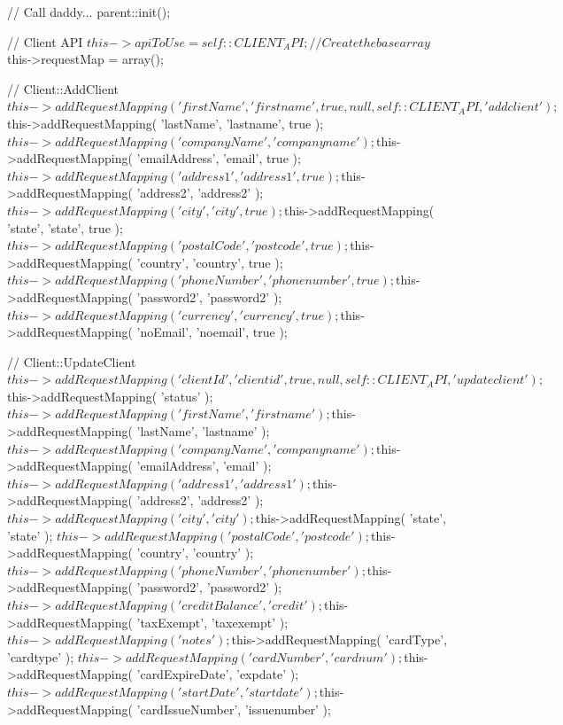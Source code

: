 \begin{DoxyCode}
    {
        //  Call daddy...
        parent::init();

        //  Client API
        $this->apiToUse = self::CLIENT_API;
        
        //  Create the base array
        $this->requestMap = array();

        //  Client::AddClient
        $this->addRequestMapping( 'firstName', 'firstname', true, null, self::CLI
      ENT_API, 'addclient' );
        $this->addRequestMapping( 'lastName', 'lastname', true );
        $this->addRequestMapping( 'companyName', 'companyname' );
        $this->addRequestMapping( 'emailAddress', 'email', true );
        $this->addRequestMapping( 'address1', 'address1', true );
        $this->addRequestMapping( 'address2', 'address2' );
        $this->addRequestMapping( 'city', 'city', true );
        $this->addRequestMapping( 'state', 'state', true );
        $this->addRequestMapping( 'postalCode', 'postcode', true );
        $this->addRequestMapping( 'country', 'country', true );
        $this->addRequestMapping( 'phoneNumber', 'phonenumber', true );
        $this->addRequestMapping( 'password2', 'password2' );
        $this->addRequestMapping( 'currency', 'currency', true );
        $this->addRequestMapping( 'noEmail', 'noemail', true );
        
        //  Client::UpdateClient
        $this->addRequestMapping( 'clientId', 'clientid', true, null, self::CLIEN
      T_API, 'updateclient' );
        $this->addRequestMapping( 'status' );
        $this->addRequestMapping( 'firstName', 'firstname' );
        $this->addRequestMapping( 'lastName', 'lastname' );
        $this->addRequestMapping( 'companyName', 'companyname' );
        $this->addRequestMapping( 'emailAddress', 'email' );
        $this->addRequestMapping( 'address1', 'address1' );
        $this->addRequestMapping( 'address2', 'address2' );
        $this->addRequestMapping( 'city', 'city' );
        $this->addRequestMapping( 'state', 'state' );
        $this->addRequestMapping( 'postalCode', 'postcode' );
        $this->addRequestMapping( 'country', 'country' );
        $this->addRequestMapping( 'phoneNumber', 'phonenumber' );
        $this->addRequestMapping( 'password2', 'password2' );
        $this->addRequestMapping( 'creditBalance', 'credit' );
        $this->addRequestMapping( 'taxExempt', 'taxexempt' );
        $this->addRequestMapping( 'notes' );
        $this->addRequestMapping( 'cardType', 'cardtype' );
        $this->addRequestMapping( 'cardNumber', 'cardnum' );
        $this->addRequestMapping( 'cardExpireDate', 'expdate' );
        $this->addRequestMapping( 'startDate', 'startdate' );
        $this->addRequestMapping( 'cardIssueNumber', 'issuenumber' );

}
\end{DoxyCode}
